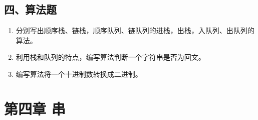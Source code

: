 \documentclass[12pt, a4paper]{article}
\begin{document}
\subsection*{四、算法题}
\begin{enumerate}
    \item 分别写出顺序栈、链栈，顺序队列、链队列的进栈，出栈，入队列、出队列的算法。
    \item 利用栈和队列的特点，编写算法判断一个字符串是否为回文。
    \item 编写算法将一个十进制数转换成二进制。
\end{enumerate}

\section{第四章 串}
\end{document}
